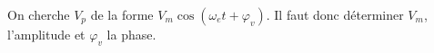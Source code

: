 \documentclass[french]{yLectureNote}
\begin{document}
On cherche $V_p$ de la forme $V_m\cos(\omega_e t +\varphi_v)$. Il faut donc déterminer $V_m$, l'amplitude et $\varphi_v$ la phase.
%
%
%
%
%
\end{document}
